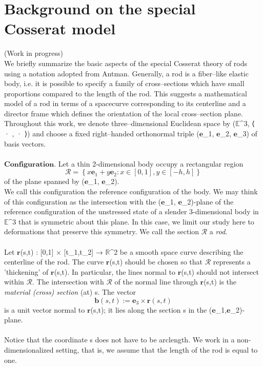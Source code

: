\documentclass[12pt]{article}
\begin{document}
\section{Background on the special Cosserat model}
(Work in progress)\\
We briefly summarize the basic aspects of the special Cosserat theory of rods using a notation adopted from Antman. Generally, a rod is a fiber–like elastic body, i.e. it is possible to specify a family of cross–sections which have small proportions compared to the length of the rod. This suggests a mathematical model of a rod in terms of a spacecurve corresponding to its centerline and a director frame which defines the orientation of the local cross–section plane.
Throughout this work, we denote three–dimensional Euclidean space by ($\mathbb{E}$^3, ⟨ · , · ⟩) and choose a fixed right–handed orthonormal triple ($\mathbf{e}$_1, $\mathbf{e}$_2, $\mathbf{e}$_3) of basis vectors.\\\\
$\mathbf{Configuration.}$ Let a thin 2-dimensional body occupy a rectangular region
\[  \mathcal{R}= \left \{
x\mathbf{e}_1 + y\mathbf{e}_2: x\in[0,1] ,y\in[-h,h] 
\right \}\]
of the plane spanned by ($\mathbf{e}$_1, $\mathbf{e}$_2).\\

We call this configuration the reference configuration of the body.
We may think of this configuration as the intersection with the ($\mathbf{e}$_1, $\mathbf{e}$_2)-plane of the reference configuration of the unstressed state of a slender 3-dimensional body in $\mathbb{E}$^3 that is symmetric about this plane. In this case, we limit our study here to deformations that preserve this symmetry. We call the section $\mathcal{R}$ a \emph{rod}.
\\\\
Let $\mathbf{r}$(s,t) : [0,1] × [t_1,t_2] → $\mathbb{R}$^2 be a smooth space curve describing the centerline of the rod.  The curve $\mathbf{r}$(s,t) should be chosen so that $\mathcal{R}$ represents a 'thickening' of $\mathbf{r}$(s,t). In particular, the lines normal to $\mathbf{r}$(s,t) should not intersect within $\mathcal{R}$. The intersection with $\mathcal{R}$ of the normal line through $\mathbf{r}$(s,t) is the \emph{material (cross) section} (at) s.  The vector 
\[ \mathbf{b}(s,t) := \mathbf{e}_3\times\mathbf{r}(s,t) \]
is a unit vector normal to $\mathbf{r}$(s,t); it lies along the section s in the ($\mathbf{e}$_1,$\mathbf{e}$_2)-plane.
\\\\
Notice that the coordinate s does not have to be arclength.
We work in a non-dimensionalized setting, that is, we assume that the length of the rod is equal to one. 
\end{document}
